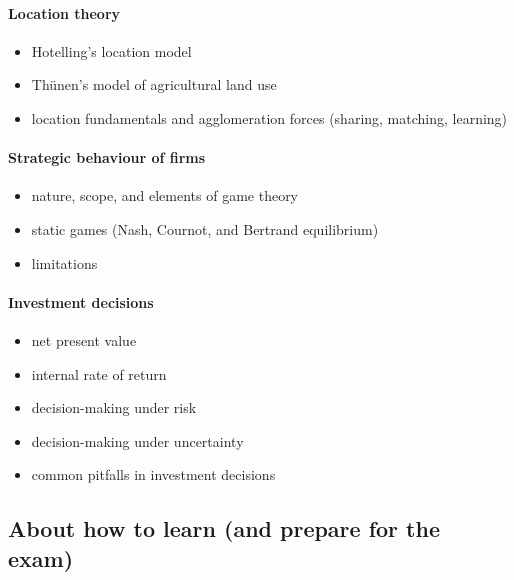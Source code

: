\documentclass[
  12pt,
  oneside]{book}
\providecommand{\tightlist}{%
  \setlength{\itemsep}{0pt}\setlength{\parskip}{0pt}}
\theoremstyle{definition}
\theoremstyle{definition}
\theoremstyle{definition}
\theoremstyle{definition}
\theoremstyle{remark}
\begin{document}
\paragraph*{Location theory}\label{location-theory}

\begin{itemize}
\tightlist
\item
  Hotelling's location model
\item
  Thünen's model of agricultural land use
\item
  location fundamentals and agglomeration forces (sharing, matching, learning)
\end{itemize}

\paragraph*{Strategic behaviour of firms}\label{strategic-behaviour-of-firms}

\begin{itemize}
\tightlist
\item
  nature, scope, and elements of game theory
\item
  static games (Nash, Cournot, and Bertrand equilibrium)
\item
  limitations
\end{itemize}

\paragraph*{Investment decisions}\label{investment-decisions}

\begin{itemize}
\tightlist
\item
  net present value
\item
  internal rate of return
\item
  decision-making under risk
\item
  decision-making under uncertainty
\item
  common pitfalls in investment decisions
\end{itemize}

\subsection*{About how to learn (and prepare for the exam)}\label{about-how-to-learn-and-prepare-for-the-exam}
\end{document}
